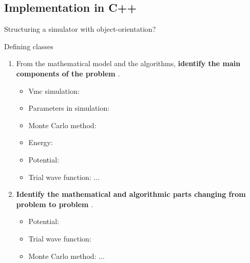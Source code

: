 \subsection{Implementation in C++}
\begin{frame}{Structuring a simulator with object-orientation?}
    \begin{alertblock}{Defining classes}
      \begin{enumerate}
        \item From the mathematical model and the algorithms, {\textbf{identify the main components of the problem}} \color{blue}{(classes)}.
          \begin {itemize}
           \item Vmc simulation: {}
           \item Parameters in simulation: {}
           \item Monte Carlo method: {}
           \item Energy: {}
           \item Potential:{}
           \item Trial wave function: {}
           ...
          \end {itemize}
          
          
                  \item {\textbf{Identify the mathematical and algorithmic parts changing from problem to problem}} \color{blue}{(superclasses)}.
          \begin {itemize}
           \item Potential:{}
           \item Trial wave function: {}
           \item Monte Carlo method: {}         ...
         \end {itemize}


      \end{enumerate}
    \end{alertblock}
\end{frame}
 
